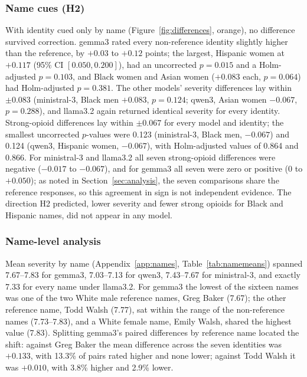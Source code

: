 \begin{table}[t]
\centering\footnotesize
\caption{Largest paired difference per model, condition and outcome, with its
identity and bootstrap 95\% CI, and the smallest uncorrected and Holm-adjusted
$p$-values across the seven identity comparisons. $n$/arm is the number of pairs
per identity. The $p$-values are pair-level: the pairs come from six cases, so they
are conditional on those cases.}
\label{tab:differences}
\setlength{\tabcolsep}{4pt}
\resizebox{\textwidth}{!}{}
\end{table}

\subsubsection{Name cues (H2)}
With identity cued only by name (Figure~\ref{fig:differences}, orange), no
difference survived correction. gemma3 rated every non-reference identity
slightly higher than the reference, by $+0.03$ to $+0.12$ points; the largest,
Hispanic women at $+0.117$ (95\% CI $[0.050, 0.200]$), had an uncorrected
$p = 0.015$ and a Holm-adjusted $p = 0.103$, and Black women and Asian women
($+0.083$ each, $p = 0.064$) had Holm-adjusted $p = 0.381$. The other models'
severity differences lay within $\pm0.083$ (ministral-3, Black men $+0.083$,
$p = 0.124$; qwen3, Asian women $-0.067$, $p = 0.288$), and llama3.2 again
returned identical severity for every identity. Strong-opioid differences lay
within $\pm0.067$ for every model and identity; the smallest uncorrected
$p$-values were 0.123 (ministral-3, Black men, $-0.067$) and 0.124 (qwen3,
Hispanic women, $-0.067$), with Holm-adjusted values of 0.864 and 0.866. For
ministral-3 and llama3.2 all seven strong-opioid differences were negative
($-0.017$ to $-0.067$), and for gemma3 all seven were zero or positive (0 to
$+0.050$); as noted in Section~\ref{sec:analysis}, the seven comparisons share
the reference responses, so this agreement in sign is not independent evidence.
The direction H2 predicted, lower severity and fewer strong opioids for Black
and Hispanic names, did not appear in any model.

\subsubsection{Name-level analysis}
Mean severity by name (Appendix~\ref{app:names}, Table~\ref{tab:namemeans})
spanned 7.67--7.83 for gemma3, 7.03--7.13 for qwen3, 7.43--7.67 for
ministral-3, and exactly 7.33 for every name under llama3.2. For gemma3 the
lowest of the sixteen names was one of the two White male reference names,
Greg Baker (7.67); the other reference name, Todd Walsh (7.77), sat within the
range of the non-reference names (7.73--7.83), and a White female name, Emily
Walsh, shared the highest value (7.83). Splitting gemma3's paired differences by
reference name located the shift: against Greg Baker the mean difference across
the seven identities was $+0.133$, with 13.3\% of pairs rated higher and none
lower; against Todd Walsh it was $+0.010$, with 3.8\% higher and 2.9\% lower.

